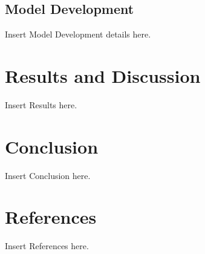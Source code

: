 \documentclass[12pt]{article}
\begin{document}
\begin{comment}
\subsubsection{Column Rename}
To enhance clarity and improve readability, several columns were renamed to more intuitive and consistent names. 
\vspace{5pt}
\subsubsection{}


\subsubsection{}


\subsubsection{}


\subsubsection{}

\end{comment}
\subsection{Model Development}
Insert Model Development details here.

\section{Results and Discussion}
Insert Results here.

\section{Conclusion}
Insert Conclusion here.

\section{References}
Insert References here.
\end{document}
